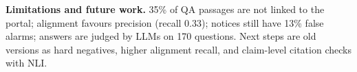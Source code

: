 \documentclass{article} %
\begin{document}
\textbf{Limitations and future work.} 35\% of QA passages are not linked to the portal; alignment favours precision
(recall 0.33); notices still have 13\% false alarms; answers are judged by LLMs on 170 questions. Next steps are old
versions as hard negatives, higher alignment recall, and claim-level citation checks with NLI.



\end{document}
